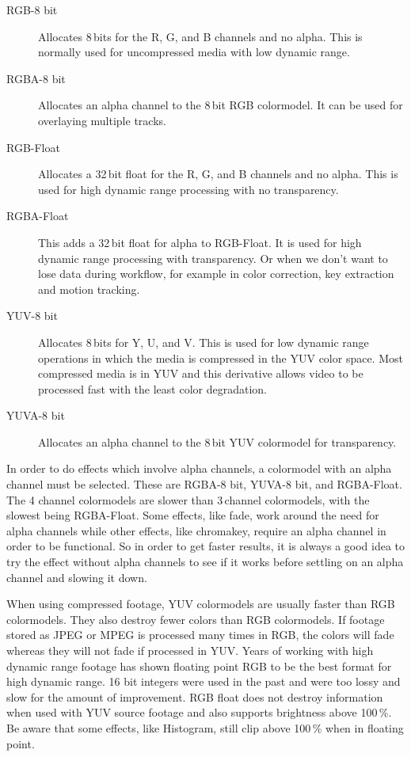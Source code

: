 \begin{description}
        \begin{description}
            \item[RGB-8 bit] 
                Allocates 8\,bits for the R, G, and B channels and no alpha. This is normally used for uncompressed media with low dynamic range.
            \item[RGBA-8 bit]
                Allocates an alpha channel to the 8\,bit RGB colormodel. It can be used for overlaying multiple tracks.\\
            \item[RGB-Float]
                Allocates a 32\,bit float for the R, G, and B channels and no alpha. This is used  for high dynamic range processing with no transparency.
            \item[RGBA-Float]
                This adds a 32\,bit float for alpha to RGB-Float. It is used for high dynamic range processing with transparency. Or when we don't want to lose data during workflow, for example in color correction, key extraction and motion tracking. \\
            \item[YUV-8 bit]
                Allocates 8\,bits for Y, U, and V. This is used for low dynamic range operations in which the media is compressed in the YUV color space. Most compressed media is in YUV and this derivative allows video to be processed fast with the least color degradation.
            \item[YUVA-8 bit]
                Allocates an alpha channel to the 8\,bit YUV colormodel for transparency.
        \end{description}       
                In order to do effects which involve alpha channels, a colormodel with an alpha channel must be selected. 
                These are RGBA-8 bit, YUVA-8 bit, and RGBA-Float. 
                The 4 channel colormodels are slower than 3\,channel colormodels, with the slowest being RGBA-Float. 
                Some effects, like fade, work around the need for alpha channels while other effects, like chromakey, require an alpha channel in order to be functional.  
                So in order to get faster results, it is always a good idea to try the effect without alpha channels to see if it works before settling on an alpha channel and slowing it down.

                When using compressed footage, YUV colormodels are usually faster than RGB colormodels. 
                They also destroy fewer colors than RGB colormodels. 
                If footage stored as JPEG or MPEG is processed many times in RGB, the colors will fade whereas they will not fade if processed in YUV.  
                Years of working with high dynamic range footage has shown floating point RGB to be the best format for high dynamic range. 
                16 bit integers were used in the past and were too lossy and slow for the amount of improvement.  
                RGB float does not destroy information when used with YUV source footage and also supports brightness above 100\,\%. 
                Be aware that some effects, like Histogram, still clip above 100\,\% when in floating point.
        

\end{description}
